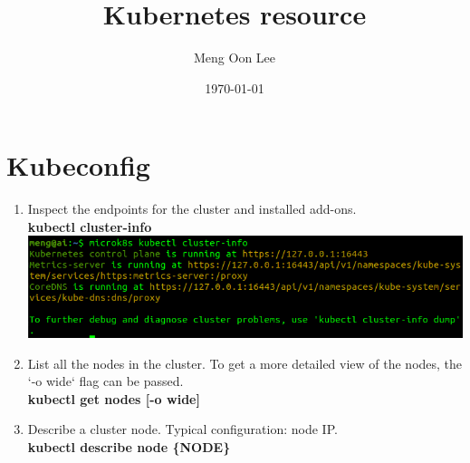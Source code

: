 \documentclass[12pt, times, a4paper]{article}
\begin{document}
\title{Kubernetes resource}
\author{Meng Oon Lee}
\date{\today}

\maketitle

\section{Kubeconfig}

\begin{enumerate}
\item Inspect the endpoints for the cluster and installed add-ons. \\
\textbf{kubectl cluster-info} \\
\newline
\includegraphics[width=\textwidth]{fig/Kubeconfig/cluster-info.png}
\item List all the nodes in the cluster. To get a more detailed view of the nodes, the `-o wide` flag can be passed. \\
\textbf{kubectl get nodes [-o wide]} \\
\newline
\item Describe a cluster node. Typical configuration: node IP. \\
\textbf{kubectl describe node \{NODE\}}
\newline
\end{enumerate}
\end{document}
